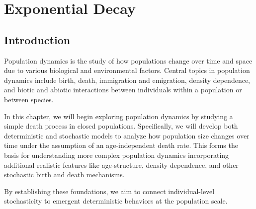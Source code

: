 \chapter{Exponential Decay}
\label{ch:04} 



\vspace{1cm}

\section{Introduction}

Population dynamics is the study of how populations change over time and space due to various biological and environmental factors. Central topics in population dynamics include birth, death, immigration and emigration, density dependence, and biotic and abiotic interactions between individuals within a population or between species. 

In this chapter, we will begin exploring population dynamics by studying a simple death process in closed populations. Specifically, we will develop both deterministic and stochastic models to analyze how population size changes over time under the assumption of an age-independent death rate. This forms the basis for understanding more complex population dynamics incorporating additional realistic features like age-structure, density dependence, and other stochastic birth and death mechanisms. 

By establishing these foundations, we aim to connect individual-level stochasticity to emergent deterministic behaviors at the population scale.

